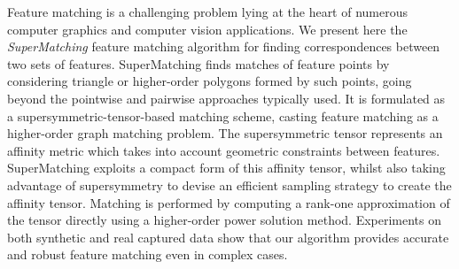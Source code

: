 Feature matching is a challenging problem lying at the heart of numerous computer graphics and computer vision applications.
We present here the \emph{SuperMatching} feature matching algorithm for finding correspondences between two sets of features.
SuperMatching finds matches of feature points by considering triangle or higher-order polygons formed by such points, going beyond the pointwise and pairwise approaches typically used.
It is formulated as a supersymmetric-tensor-based matching scheme,
casting feature matching as a higher-order graph matching problem.
The supersymmetric tensor represents an affinity metric which takes into account geometric constraints between features.
SuperMatching exploits a compact form of this affinity tensor,
whilst also taking advantage of supersymmetry to devise an
efficient sampling strategy to create the affinity tensor.
Matching is performed by computing a rank-one approximation of the tensor directly
using a higher-order power solution method.
Experiments on both synthetic and real captured data show that
our algorithm provides accurate and robust feature matching even in complex cases.